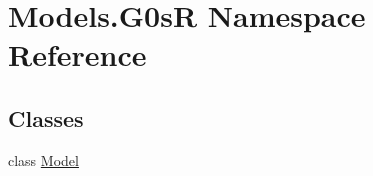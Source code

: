 \hypertarget{namespace_models_1_1_g0s_r}{\section{Models.\-G0s\-R Namespace Reference}
\label{namespace_models_1_1_g0s_r}
}
\subsection*{Classes}
\begin{DoxyCompactItemize}
\item 
class \hyperlink{class_models_1_1_g0s_r_1_1_model}{Model}
\end{DoxyCompactItemize}
